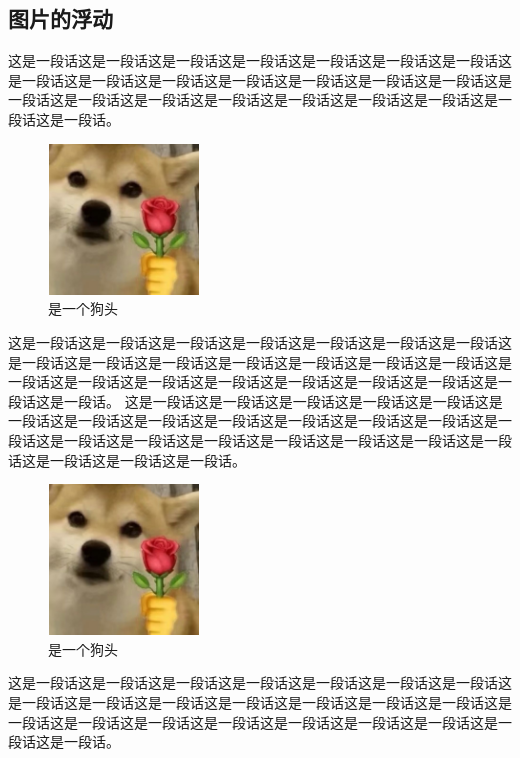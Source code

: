 \documentclass[normalsize]{article}   %
\begin{document}
		\subsection{图片的浮动}
			这是一段话这是一段话这是一段话这是一段话这是一段话这是一段话这是一段话这是一段话这是一段话这是一段话这是一段话这是一段话这是一段话这是一段话这是一段话这是一段话这是一段话这是一段话这是一段话这是一段话这是一段话这是一段话这是一段话。
		\begin{figure}[h]
			\centering
			\includegraphics[height=4cm,width=4cm]{./img/sample.png}%
			\caption{是一个狗头}
			\label{fig:10}
		\end{figure}
		这是一段话这是一段话这是一段话这是一段话这是一段话这是一段话这是一段话这是一段话这是一段话这是一段话这是一段话这是一段话这是一段话这是一段话这是一段话这是一段话这是一段话这是一段话这是一段话这是一段话这是一段话这是一段话这是一段话。
		\newpage
			这是一段话这是一段话这是一段话这是一段话这是一段话这是一段话这是一段话这是一段话这是一段话这是一段话这是一段话这是一段话这是一段话这是一段话这是一段话这是一段话这是一段话这是一段话这是一段话这是一段话这是一段话这是一段话这是一段话。
			\begin{figure}[t]
			\centering
			\includegraphics[height=4cm,width=4cm]{./img/sample.png}%
			\caption{是一个狗头}
			\label{fig:10}
		\end{figure}
		这是一段话这是一段话这是一段话这是一段话这是一段话这是一段话这是一段话这是一段话这是一段话这是一段话这是一段话这是一段话这是一段话这是一段话这是一段话这是一段话这是一段话这是一段话这是一段话这是一段话这是一段话这是一段话这是一段话。
\end{document}
